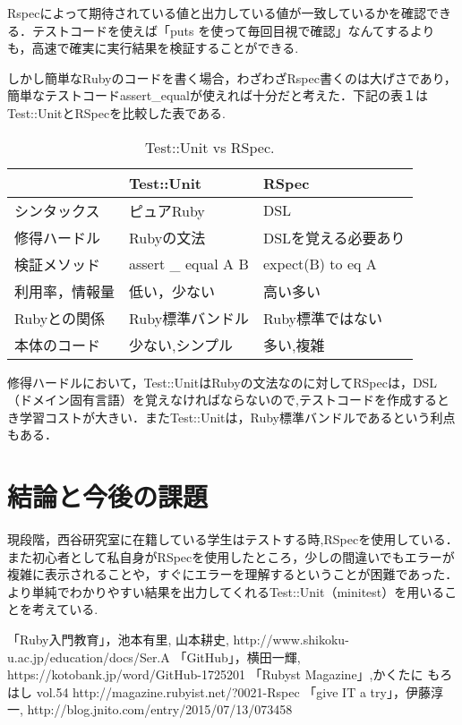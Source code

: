 \documentclass[a4j,twocolumn,uplatex]{jsarticle}
\begin{document}
Rspecによって期待されている値と出力している値が一致しているかを確認できる．テストコードを使えば「puts を使って毎回目視で確認」なんてするよりも，高速で確実に実行結果を検証することができる.

しかし簡単なRubyのコードを書く場合，わざわざRspec書くのは大げさであり，簡単なテストコードassert\_equalが使えれば十分だと考えた．下記の表１はTest::UnitとRSpecを比較した表である.

\begin{table}[htb]
  \begin{center}
   \caption{Test::Unit vs RSpec.}
   \begin{tabular}{|l||l|l|} \hline
        & Test::Unit  &  RSpec  \\
    \hline \hline
    シンタックス  & ピュアRuby  & DSL \\
    修得ハードル  & Rubyの文法   &  DSLを覚える必要あり\\
    検証メソッド  & assert \_ equal A B  &  expect(B) to eq A \\
    利用率，情報量&低い，少ない&高い多い\\
    Rubyとの関係 & Ruby標準バンドル& Ruby標準ではない\\
    本体のコード&少ない,シンプル&多い,複雑\\
    \hline
  \end{tabular}
  \end{center}
\end{table}

修得ハードルにおいて，Test::UnitはRubyの文法なのに対してRSpecは，DSL（ドメイン固有言語）を覚えなければならないので,テストコードを作成するとき学習コストが大きい．またTest::Unitは，Ruby標準バンドルであるという利点もある．
\section{結論と今後の課題}
現段階，西谷研究室に在籍している学生はテストする時,RSpecを使用している．
また初心者として私自身がRSpecを使用したところ，少しの間違いでもエラーが複雑に表示されることや，すぐにエラーを理解するということが困難であった．より単純でわかりやすい結果を出力してくれるTest::Unit（minitest）を用いることを考えている\cite{4}.

\begin{flushleft}
\begin{thebibliography}{9}
「Ruby入門教育」，池本有里, 山本耕史, http://www.shikoku-u.ac.jp/education/docs/Ser.A
 「GitHub」，横田一輝, https://kotobank.jp/word/GitHub-1725201
 「Rubyst Magazine」,かくたに もろはし vol.54 http://magazine.rubyist.net/?0021-Rspec
 「give IT a try」，伊藤淳一, http://blog.jnito.com/entry/2015/07/13/073458
\end{thebibliography}
\end{flushleft}
\end{document}
